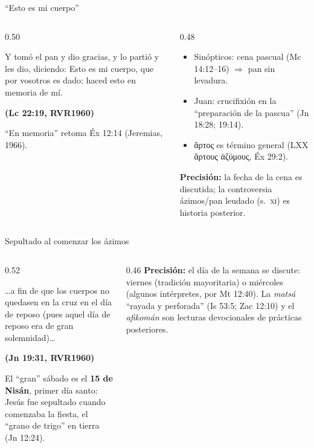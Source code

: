 \documentclass[hyperref={bookmarks=false},aspectratio=169]{beamer}
\newcommand{\grc}[1]{\foreignlanguage{ancientgreek}{#1}}
\newcommand{\fuente}[1]{\par\hfill{\upshape\bfseries\footnotesize\textcolor{tierraroja}{#1}}}
\newcommand{\destacar}[1]{\textbf{\textcolor{tierraroja}{#1}}}
\newcommand{\precision}[1]{{\footnotesize\color{sepia}\textbf{Precisión:} #1}}
\begin{document}
\begin{frame}{``Esto es mi cuerpo''}
\begin{columns}[t,onlytextwidth]
\begin{column}{0.50\textwidth}
\begin{cita}Y tomó el pan y dio gracias, y lo partió y les dio, diciendo: Esto es mi cuerpo, que por vosotros es dado; haced esto en memoria de mí.\fuente{(Lc 22:19, RVR1960)}\end{cita}
\small ``En memoria'' retoma Éx 12:14 (Jeremias, 1966).
\end{column}
\begin{column}{0.48\textwidth}\scriptsize
\begin{itemize}
\item Sinópticos: cena pascual (Mc 14:12--16) $\Rightarrow$ pan sin levadura.
\item Juan: crucifixión en la ``preparación de la pascua'' (Jn 18:28; 19:14).
\item \grc{ἄρτος} es término general (LXX \grc{ἄρτους ἀζύμους}, Éx 29:2).
\end{itemize}
\precision{la fecha de la cena es discutida; la controversia ázimos/pan leudado (s.~\textsc{xi}) es historia posterior.}
\end{column}
\end{columns}
\end{frame}

\begin{frame}{Sepultado al comenzar los ázimos}
\begin{columns}[t,onlytextwidth]
\begin{column}{0.52\textwidth}
\begin{cita}\ldots{}a fin de que los cuerpos no quedasen en la cruz en el día de reposo (pues aquel día de reposo era de gran solemnidad)\ldots\fuente{(Jn 19:31, RVR1960)}\end{cita}
\small El ``gran'' sábado es el \destacar{15 de Nisán}, primer día santo: Jesús fue sepultado cuando comenzaba la fiesta, el ``grano de trigo'' en tierra (Jn 12:24).
\end{column}
\begin{column}{0.46\textwidth}\scriptsize
\precision{el día de la semana se discute: viernes (tradición mayoritaria) o miércoles (algunos intérpretes, por Mt 12:40). La \emph{matsá} ``rayada y perforada'' (Is 53:5; Zac 12:10) y el \emph{afikomán} son lecturas devocionales de prácticas posteriores.}
\end{column}
\end{columns}
\end{frame}
\end{document}
